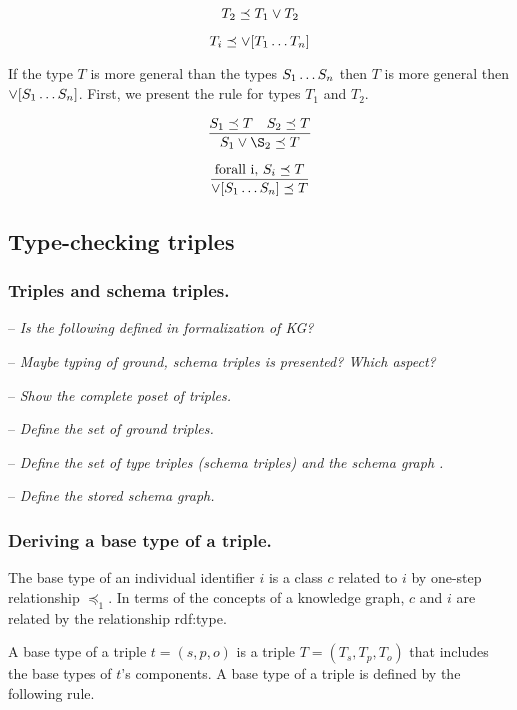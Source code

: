 \documentclass[runningheads]{llncs}
\newcommand{\nl}{\hfill\break}
\newcommand{\notes}[1]{\noindent\begin{small}-- \emph{#1}\\\end{small}}
\begin{document}
\begin{equation}
T_2\preceq\/T_1\lor\/T_2  
\end{equation}

\begin{equation}
T_i\preceq\/\lor[T_1\ldots\/T_n]  
\end{equation}

If the type $T$ is more general than the types $S_1\ldots\/S_n$ then
$T$ is more general then $\lor[S_1\ldots\/S_n]$. First, we present
the rule for types $T_1$ and $T_2$.

\begin{equation}
\dfrac{S_1\preceq\/T\quad\/S_2\preceq\/\/T}
      {S_1\lor\S_2\preceq\/T}  
\end{equation}

\begin{equation}
\dfrac{\text{forall i,\ } S_i\preceq\/T}
      {\lor[S_1\ldots\/S_n]\preceq\/T}  
\end{equation}



\subsection{Type-checking triples}

\subsubsection{Triples and schema triples.}\nl

\notes{Is the following defined in formalization of KG?}
\notes{Maybe typing of ground, schema triples is presented? Which aspect?}
\notes{Show the complete poset of triples.}
\notes{Define the set of ground triples.}
\notes{Define the set of type triples (schema triples) and the schema graph .}
\notes{Define the stored schema graph.}

\subsubsection{Deriving a base type of a triple.}

\noindent The base type of an individual identifier $i$ is a class $c$
related to $i$ by one-step relationship $\preceq_1$. In terms of the
concepts of a knowledge graph, $c$ and $i$ are related by the
relationship rdf:type.

A base type of a triple $t=(s,p,o)$ is a triple $T=(T_s,T_p,T_o)$ that
includes the base types of $t$'s components. A base type of a triple
is defined by the following rule.
\end{document}
